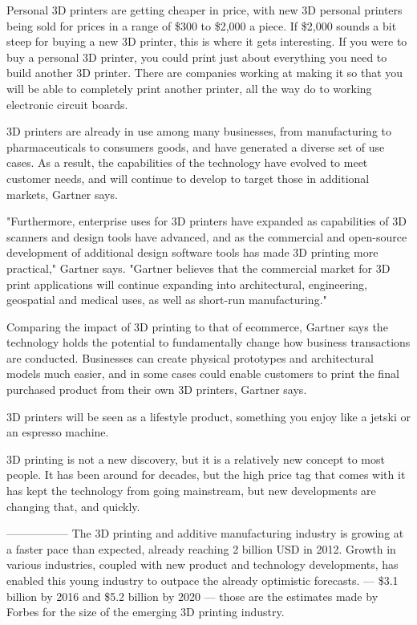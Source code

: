 \documentclass[11pt,a4paper,titlepage]{article}
\begin{document}
Personal 3D printers are getting cheaper in price, with new 3D personal printers being sold for prices in a range of \$300 to \$2,000 a piece. If \$2,000 sounds a bit steep for buying a new 3D printer, this is where it gets interesting. If you were to buy a personal 3D printer, you could print just about everything you need to build another 3D printer. There are companies working at making it so that you will be able to completely print another printer, all the way do to working electronic circuit boards.

 

3D printers are already in use among many businesses, from manufacturing to pharmaceuticals to consumers goods, and have generated a diverse set of use cases. As a result, the capabilities of the technology have evolved to meet customer needs, and will continue to develop to target those in additional markets, Gartner says.

"Furthermore, enterprise uses for 3D printers have expanded as capabilities of 3D scanners and design tools have advanced, and as the commercial and open-source development of additional design software tools has made 3D printing more practical," Gartner says. "Gartner believes that the commercial market for 3D print applications will continue expanding into architectural, engineering, geospatial and medical uses, as well as short-run manufacturing."

Comparing the impact of 3D printing to that of ecommerce, Gartner says the technology holds the potential to fundamentally change how business transactions are conducted. Businesses can create physical prototypes and architectural models much easier, and in some cases could enable customers to print the final purchased product from their own 3D printers, Gartner says.

3D printers will be seen as a lifestyle product, something you enjoy like a jetski or an espresso machine.

3D printing is not a new discovery, but it is a relatively new concept to most people. It has been around for decades, but the high price tag that comes with it has kept the technology from going mainstream, but new developments are changing that, and quickly.

-----------------
The 3D printing and additive manufacturing industry is growing at a faster pace than expected, already reaching 2 billion USD in 2012.  Growth in various industries, coupled with new product and technology developments, has enabled this young industry to outpace the already optimistic forecasts.
---
\$3.1 billion by 2016 and \$5.2 billion by 2020 — those are the estimates made by Forbes for the size of the emerging 3D printing industry.
\end{document}
